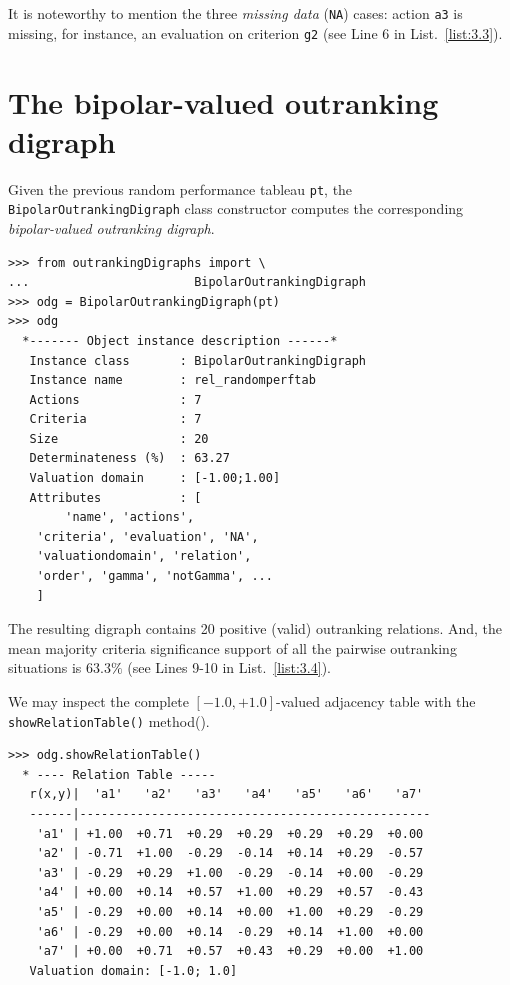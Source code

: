 It is noteworthy to mention the three \emph{missing data} (\texttt{NA}) cases: action \texttt{a3} is missing, for instance, an evaluation on criterion \texttt{g2} (see Line 6 in List.~\vref{list:3.3}).
    
\section{The bipolar-valued outranking digraph}
\label{sec:3.2}

Given the previous random performance tableau \texttt{pt}, the \texttt{BipolarOutranking\-Digraph} class constructor computes the corresponding \emph{bipolar-valued outranking digraph}. 
\begin{lstlisting}[caption={Example of random bipolar-valued outranking digraph.},label=list:3.4]
>>> from outrankingDigraphs import \
...                       BipolarOutrankingDigraph
>>> odg = BipolarOutrankingDigraph(pt)
>>> odg
  *------- Object instance description ------*
   Instance class       : BipolarOutrankingDigraph
   Instance name        : rel_randomperftab
   Actions              : 7
   Criteria             : 7
   Size                 : 20
   Determinateness (%)  : 63.27
   Valuation domain     : [-1.00;1.00]
   Attributes           : [
        'name', 'actions', 
	'criteria', 'evaluation', 'NA',
	'valuationdomain', 'relation', 
	'order', 'gamma', 'notGamma', ...
	]
\end{lstlisting}

The resulting digraph contains 20 positive (valid) outranking relations. And, the mean majority criteria significance support of all the pairwise outranking situations is $63.3\%$ (see Lines 9-10 in List.~\vref{list:3.4}).

We may inspect the complete $[-1.0,+1.0]$-valued adjacency table with the \texttt{showRelationTable()} method().
\begin{lstlisting}[caption={Inspecting the valued adjacency table.},label=list:3.5]
>>> odg.showRelationTable()
  * ---- Relation Table -----
   r(x,y)|  'a1'   'a2'   'a3'   'a4'   'a5'   'a6'   'a7'   
   ------|-------------------------------------------------
    'a1' | +1.00  +0.71  +0.29  +0.29  +0.29  +0.29  +0.00  
    'a2' | -0.71  +1.00  -0.29  -0.14  +0.14  +0.29  -0.57  
    'a3' | -0.29  +0.29  +1.00  -0.29  -0.14  +0.00  -0.29  
    'a4' | +0.00  +0.14  +0.57  +1.00  +0.29  +0.57  -0.43  
    'a5' | -0.29  +0.00  +0.14  +0.00  +1.00  +0.29  -0.29  
    'a6' | -0.29  +0.00  +0.14  -0.29  +0.14  +1.00  +0.00  
    'a7' | +0.00  +0.71  +0.57  +0.43  +0.29  +0.00  +1.00  
   Valuation domain: [-1.0; 1.0]
\end{lstlisting}

